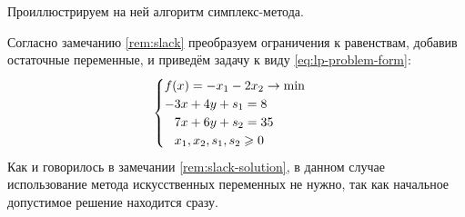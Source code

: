 Проиллюстрируем на ней алгоритм симплекс-метода.

Согласно замечанию \ref{rem:slack} преобразуем ограничения к
равенствам, добавив остаточные переменные, и приведём задачу к виду
\eqref{eq:lp-problem-form}:
\begin{equation*}
  \begin{cases}
    f(x) = -x_1-2x_2 \to \min \\
    -3x+4y+s_1 = 8 \\
    \phm 7x+6y+s_2 = 35 \\
    \phm x_1, x_2, s_1, s_2 \geq 0
  \end{cases}
\end{equation*}
Как и говорилось в замечании \ref{rem:slack-solution}, в данном случае
использование метода искусственных переменных не нужно, так как
начальное допустимое решение находится сразу.

